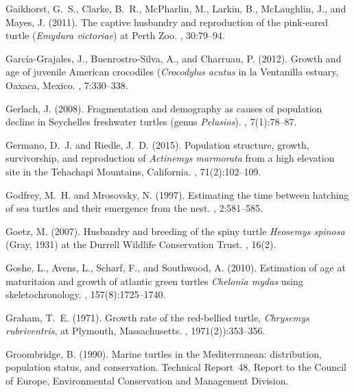 \documentclass{article}
\begin{document}
\begin{thebibliography}{}
Gaikhorst, G.~S., Clarke, B.~R., McPharlin, M., Larkin, B., McLaughlin, J., and
  Mayes, J. (2011).
\newblock The captive husbandry and reproduction of the pink-eared turtle
  (\emph{Emydura victoriae}) at {P}erth {Z}oo.
, 30:79--94.

Garc\'{i}a-Grajales, J., Buenrostro-Silva, A., and Charruau, P. (2012).
\newblock Growth and age of juvenile {A}merican crocodiles (\emph{Crocodylus
  acutus} in la {V}entanilla estuary, {O}axaca, {M}exico.
, 7:330--338.

Gerlach, J. (2008).
\newblock Fragmentation and demography as causes of population decline in
  {S}eychelles freshwater turtles (genus \emph{Pelusios}).
, 7(1):78--87.

Germano, D.~J. and Riedle, J.~D. (2015).
\newblock Population structure, growth, survivorship, and reproduction of
  \emph{Actinemys marmorata} from a high elevation site in the {T}ehachapi
  {M}ountains, {C}alifornia.
, 71(2):102--109.

Godfrey, M.~H. and Mrosovsky, N. (1997).
\newblock Estimating the time between hatching of sea turtles and their
  emergence from the nest.
, 2:581--585.

Goetz, M. (2007).
\newblock Husbandry and breeding of the spiny turtle \emph{Heosemys spinosa}
  ({G}ray, 1931) at the {D}urrell {W}ildlife {C}onservation {T}rust.
, 16(2).

Goshe, L., Avens, L., Scharf, F., and Southwood, A. (2010).
\newblock Estimation of age at maturitaion and growth of atlantic green turtles
  \emph{Chelonia mydas} using skeletochronology.
, 157(8):1725--1740.

Graham, T.~E. (1971).
\newblock Growth rate of the red-bellied turtle, \emph{Chrysemys rubriventris},
  at {P}lymouth, {M}assachusetts.
, 1971(2)):353--356.

Groombridge, B. (1990).
\newblock Marine turtles in the {M}editerranean: distribution, population
  status, and conservation.
\newblock Technical Report~48, {Report to the Council of Europe, Environmental
  Conservation and Management Division}.


\end{thebibliography}
\end{document}
